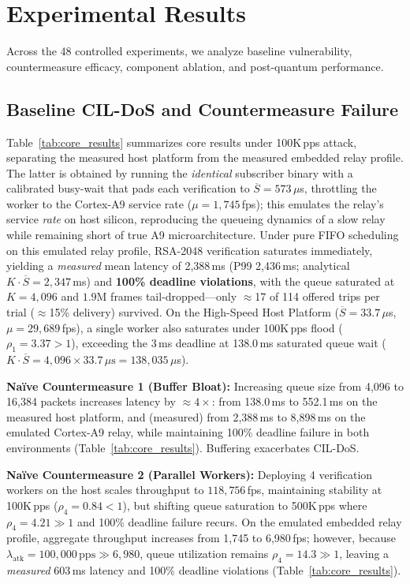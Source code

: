 \documentclass[journal]{IEEEtran}
\begin{document}
\section{Experimental Results}
\label{sec:results}

Across the 48 controlled experiments, we analyze baseline vulnerability, countermeasure efficacy, component ablation, and post-quantum performance.

\subsection{Baseline CIL-DoS and Countermeasure Failure}
Table~\ref{tab:core_results} summarizes core results under 100K\,pps attack, separating the measured host platform from the measured embedded relay profile. The latter is obtained by running the \emph{identical} subscriber binary with a calibrated busy-wait that pads each verification to $\overline{S}=573\,\mu$s, throttling the worker to the Cortex-A9 service rate ($\mu=1{,}745$\,fps); this emulates the relay's service \emph{rate} on host silicon, reproducing the queueing dynamics of a slow relay while remaining short of true A9 microarchitecture.
Under pure FIFO scheduling on this emulated relay profile, RSA-2048 verification saturates immediately, yielding a \emph{measured} mean latency of 2,388\,ms (P99 2,436\,ms; analytical $K\cdot\overline{S}=2{,}347$\,ms) and \textbf{100\% deadline violations}, with the queue saturated at $K=4{,}096$ and $1.9$M frames tail-dropped---only $\approx$17 of 114 offered trips per trial ($\approx$15\% delivery) survived. On the High-Speed Host Platform ($\overline{S} = 33.7\,\mu$s, $\mu = 29{,}689$\,fps), a single worker also saturates under 100K\,pps flood ($\rho_1 = 3.37 > 1$), exceeding the 3\,ms deadline at 138.0\,ms saturated queue wait ($K \cdot \overline{S} = 4{,}096 \times 33.7\,\mu\text{s} = 138{,}035\,\mu$s).

\textbf{Na\"ive Countermeasure 1 (Buffer Bloat):} Increasing queue size from 4,096 to 16,384 packets increases latency by $\approx 4\times$: from 138.0\,ms to 552.1\,ms on the measured host platform, and (measured) from 2,388\,ms to 8,898\,ms on the emulated Cortex-A9 relay, while maintaining 100\% deadline failure in both environments (Table~\ref{tab:core_results}). Buffering exacerbates CIL-DoS.

\textbf{Na\"ive Countermeasure 2 (Parallel Workers):} Deploying 4 verification workers on the host scales throughput to $118{,}756$\,fps, maintaining stability at 100K\,pps ($\rho_4 = 0.84 < 1$), but shifting queue saturation to 500K\,pps where $\rho_4 = 4.21 \gg 1$ and 100\% deadline failure recurs. On the emulated embedded relay profile, aggregate throughput increases from 1,745 to 6,980\,fps; however, because $\lambda_{\text{atk}} = 100{,}000\,\text{pps} \gg 6{,}980$, queue utilization remains $\rho_4 = 14.3 \gg 1$, leaving a \emph{measured} 603\,ms latency and 100\% deadline violations (Table~\ref{tab:core_results}).
\end{document}
